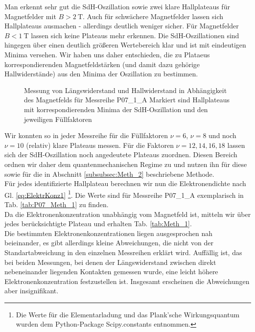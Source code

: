 Man erkennt sehr gut die SdH-Oszillation sowie zwei klare Hallplateaus für Magnetfelder mit $B>\SI{2}{\tesla}$. Auch für schwächere Magnetfelder lassen sich Hallplateaus ausmachen - allerdings deutlich weniger sicher. Für Magnetfelder $B<\SI{1}{\tesla}$ lassen sich keine Plateaus mehr erkennen. Die SdH-Oszillationen sind hingegen über einen deutlich größeren Wertebereich klar und ist mit eindeutigen Minima versehen. Wir haben uns daher entschieden, die zu Plataeus korrespondierenden Magnetfeldstärken (und damit dazu gehörige Hallwiderstände) aus den Minima der Oszillation zu bestimmen.

\begin{figure}[h!]
	\centering
	
    \caption{Messung von Längswiderstand und Hallwiderstand in Abhängigkeit des Magnetfelds für Messreihe P07\_1\_A Markiert sind Hallplateaus mit korrespondierenden Minima der SdH-Oszillation und den jeweiligen Füllfaktoren}
	\label{abb:P07_Meth_1}
\end{figure}

Wir konnten so in jeder Messreihe für die Füllfaktoren $\nu = 6$, $\nu = 8$ und noch $\nu = 10 $ (relativ) klare Plateaus messen. Für die Faktoren $\nu = 12, 14, 16, 18$ lassen sich der SdH-Oszillation noch angedeutete Plateaus zuordnen. Diesen Bereich ordnen wir daher dem quantenmechanischen Regime zu und nutzen ihn für diese sowie für die in Abschnitt \ref{subsubsec:Meth_2} beschriebene Methode. \\
Für jedes identifizierte Hallplateau berechnen wir nun die Elektronendichte nach Gl. \ref{eq:ElektrKonz1} \footnote{Die Werte für die Elementarladung und das Plank'sche Wirkungsquantum wurden dem Python-Package Scipy.constants entnommen.}. Die Werte sind für Messreihe P07\_1\_A exemplarisch in Tab. \ref{tab:P07_Meth_1} zu finden. \\

Da die Elektronenkonzentration unabhängig vom Magnetfeld ist, mitteln wir über jedes berücksichtigte Plateau und erhalten Tab. \ref{tab:Meth_1}. \\ 

Die bestimmten Elektronenkonzentrationen liegen ausgesprochen nah beieinander, es gibt allerdings kleine Abweichungen, die nicht von der Standartabweichung in den einzelnen Messreihen erklärt wird. Auffällig ist, das bei beiden Messungen, bei denen der Längswiderstand zwischen direkt nebeneinander liegenden Kontakten gemessen wurde, eine leicht höhere Elektronenkonzentration festzustellen ist. Insgesamt erscheinen die Abweichungen aber insignifikant. \\

